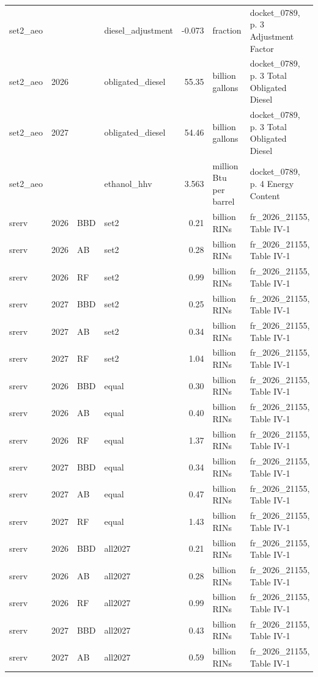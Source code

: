 \begin{longtable}{p{2.3cm}p{0.7cm}p{1.0cm}p{2.6cm}rp{1.7cm}p{4.6cm}}
set2\_aeo &  &  & diesel\_adjustment & -0.073 & fraction & docket\_0789, p. 3 Adjustment Factor \\
set2\_aeo & 2026 &  & obligated\_diesel & 55.35 & billion gallons & docket\_0789, p. 3 Total Obligated Diesel \\
set2\_aeo & 2027 &  & obligated\_diesel & 54.46 & billion gallons & docket\_0789, p. 3 Total Obligated Diesel \\
set2\_aeo &  &  & ethanol\_hhv & 3.563 & million Btu per barrel & docket\_0789, p. 4 Energy Content \\
srerv & 2026 & BBD & set2 & 0.21 & billion RINs & fr\_2026\_21155, Table IV-1 \\
srerv & 2026 & AB & set2 & 0.28 & billion RINs & fr\_2026\_21155, Table IV-1 \\
srerv & 2026 & RF & set2 & 0.99 & billion RINs & fr\_2026\_21155, Table IV-1 \\
srerv & 2027 & BBD & set2 & 0.25 & billion RINs & fr\_2026\_21155, Table IV-1 \\
srerv & 2027 & AB & set2 & 0.34 & billion RINs & fr\_2026\_21155, Table IV-1 \\
srerv & 2027 & RF & set2 & 1.04 & billion RINs & fr\_2026\_21155, Table IV-1 \\
srerv & 2026 & BBD & equal & 0.30 & billion RINs & fr\_2026\_21155, Table IV-1 \\
srerv & 2026 & AB & equal & 0.40 & billion RINs & fr\_2026\_21155, Table IV-1 \\
srerv & 2026 & RF & equal & 1.37 & billion RINs & fr\_2026\_21155, Table IV-1 \\
srerv & 2027 & BBD & equal & 0.34 & billion RINs & fr\_2026\_21155, Table IV-1 \\
srerv & 2027 & AB & equal & 0.47 & billion RINs & fr\_2026\_21155, Table IV-1 \\
srerv & 2027 & RF & equal & 1.43 & billion RINs & fr\_2026\_21155, Table IV-1 \\
srerv & 2026 & BBD & all2027 & 0.21 & billion RINs & fr\_2026\_21155, Table IV-1 \\
srerv & 2026 & AB & all2027 & 0.28 & billion RINs & fr\_2026\_21155, Table IV-1 \\
srerv & 2026 & RF & all2027 & 0.99 & billion RINs & fr\_2026\_21155, Table IV-1 \\
srerv & 2027 & BBD & all2027 & 0.43 & billion RINs & fr\_2026\_21155, Table IV-1 \\
srerv & 2027 & AB & all2027 & 0.59 & billion RINs & fr\_2026\_21155, Table IV-1 \\

\end{longtable}
